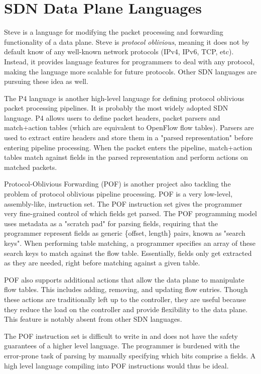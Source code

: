 \section{SDN Data Plane Languages} \label{rel:p4}

Steve is a language for modifying the packet processing and forwarding functionality of a data plane. Steve is \textit{protocol oblivious}, meaning it does not by default
know of any well-known network protocols (IPv4, IPv6, TCP, etc). Instead, it
provides language features for programmers to deal with any protocol, making the
language more scalable for future protocols. Other SDN languages are pursuing
these idea as well.

The P4 language \cite{p4_spec, p4_spec2, p42014} is another high-level language for
defining protocol oblivious packet processing pipelines. It is probably the
most widely adopted SDN language. P4 allows users to define packet headers,
packet parsers and
match+action tables (which are equivalent to OpenFlow flow tables). Parsers are
used to extract entire headers and store them in a "parsed representation"
before entering pipeline processing. When the packet enters the pipeline,
match+action tables match against fields in the parsed representation and
perform actions on matched packets.

Protocol-Oblivious Forwarding (POF) \cite{pof_fis, pof, pof_impl} is another
project also tackling the problem of protocol oblivious pipeline processing. POF
is a very low-level, assembly-like, instruction set. The POF instruction
set gives the programmer very fine-grained control of which fields get parsed.
The POF programming model uses metadata as a "scratch pad" for parsing fields,
requiring that the
programmer represent fields as generic \{offset, length\} pairs, known as
"search keys". When performing table matching, a programmer specifies
an array of these search keys to match against the flow table.
Essentially, fields only get extracted as they are needed, right before matching
against a given table.

POF also supports additional actions that allow the data plane to manipulate
flow tables. This includes adding, removing, and updating flow
entries. Though these actions are traditionally left up to the controller, they
are useful because they reduce the load on the controller and provide
flexibility to the data plane. This feature is notably absent from other SDN
languages.

The POF instruction set is difficult to write in and does not have the safety
guarantees of a higher level language. The programmer is burdened with the
error-prone task of parsing by manually specifying which bits comprise a fields.
A high level language compiling into POF instructions would thus be ideal.

